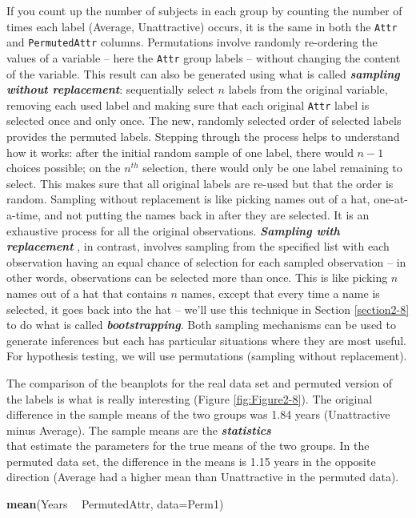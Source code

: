 \documentclass[]{book}
\newenvironment{Shaded}{\begin{snugshade}}{\end{snugshade}}
\newcommand{\KeywordTok}[1]{\textcolor[rgb]{0.13,0.29,0.53}{\textbf{#1}}}
\newcommand{\DataTypeTok}[1]{\textcolor[rgb]{0.13,0.29,0.53}{#1}}
\newcommand{\StringTok}[1]{\textcolor[rgb]{0.31,0.60,0.02}{#1}}
\newcommand{\OperatorTok}[1]{\textcolor[rgb]{0.81,0.36,0.00}{\textbf{#1}}}
\newcommand{\NormalTok}[1]{#1}
\begin{document}
If you count up the number of subjects in each group by counting the
number of times each label (Average, Unattractive) occurs, it is the
same in both the \texttt{Attr} and \texttt{PermutedAttr} columns.
Permutations involve randomly re-ordering the values of a variable --
here the \texttt{Attr} group labels -- without changing the content of
the variable. This result can also be generated using what is called
\textbf{\emph{sampling without replacement}}: sequentially select \(n\)
labels from the original variable, removing each used label and making
sure that each original \texttt{Attr} label is selected once and only
once. The new, randomly selected order of selected labels provides the
permuted labels. Stepping through the process helps to understand how it
works: after the initial random sample of one label, there would
\(n - 1\) choices possible; on the \(n^{th}\) selection, there would
only be one label remaining to select. This makes sure that all original
labels are re-used but that the order is random. Sampling without
replacement is like picking names out of a hat, one-at-a-time, and not
putting the names back in after they are selected. It is an exhaustive
process for all the original observations. \textbf{\emph{Sampling with
replacement}} , in contrast, involves sampling from the specified list
with each observation having an equal chance of selection for each
sampled observation -- in other words, observations can be selected more
than once. This is like picking \(n\) names out of a hat that contains
\(n\) names, except that every time a name is selected, it goes back
into the hat -- we'll use this technique in Section \ref{section2-8} to
do what is called \textbf{\emph{bootstrapping}}. Both sampling
mechanisms can be used to generate inferences but each has particular
situations where they are most useful. For hypothesis testing, we will
use permutations (sampling without replacement).

The comparison of the beanplots for the real data set and permuted
version of the labels is what is really interesting (Figure
\ref{fig:Figure2-8}). The original difference in the sample means of the
two groups was 1.84 years (Unattractive minus Average). The sample means
are the \textbf{\emph{statistics}}\\
that estimate the parameters for the true means of the two groups. In
the permuted data set, the difference in the means is 1.15 years in the
opposite direction (Average had a higher mean than Unattractive in the
permuted data).

\begin{Shaded}
\begin{Highlighting}[]
\KeywordTok{mean}\NormalTok{(Years }\OperatorTok{~}\StringTok{ }\NormalTok{PermutedAttr, }\DataTypeTok{data=}\NormalTok{Perm1)}
\end{Highlighting}
\end{Shaded}
\end{document}
